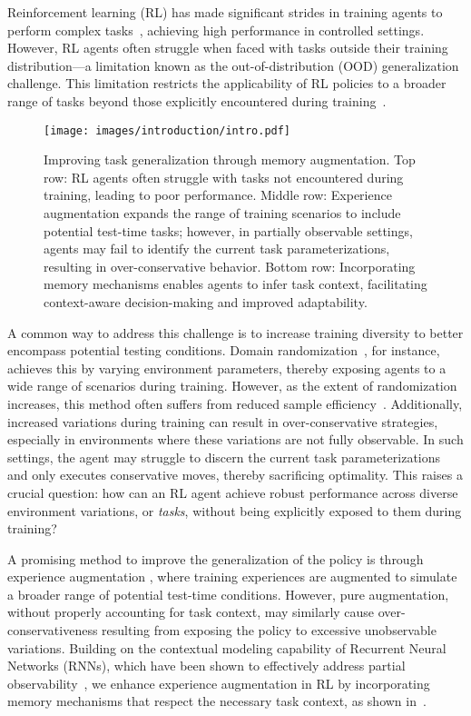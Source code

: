 Reinforcement learning (RL) has made significant strides in training agents to perform complex tasks~\citep{lee2020LearnQuadrupedalLoco, kumar2021rma, miki2022perceptiveLoco, hoeller2024parkour, li2023learning}, achieving high performance in controlled settings.
However, RL agents often struggle when faced with tasks outside their training distribution—a limitation known as the out-of-distribution (OOD) generalization challenge.
This limitation restricts the applicability of RL policies to a broader range of tasks beyond those explicitly encountered during training~\citep{li2023versatile, li2024fld}.

\begin{figure}
\centering
\texttt{[image: images/introduction/intro.pdf]}
\caption{Improving task generalization through memory augmentation. Top row: RL agents often struggle with tasks not encountered during training, leading to poor performance.
Middle row: Experience augmentation expands the range of training scenarios to include potential test-time tasks; however, in partially observable settings, agents may fail to identify the current task parameterizations, resulting in over-conservative behavior.
Bottom row: Incorporating memory mechanisms enables agents to infer task context, facilitating context-aware decision-making and improved adaptability.}
\label{fig:intro}
\end{figure}

A common way to address this challenge is to increase training diversity to better encompass potential testing conditions. 
Domain randomization~\citep{tobin2017DRforSim2Real, sadeghi2016cad2rl, peng2018DynRand}, for instance, achieves this by varying environment parameters, thereby exposing agents to a wide range of scenarios during training.
However, as the extent of randomization increases, this method often suffers from reduced sample efficiency~\citep{kirk2023surveyZSG}. 
Additionally, increased variations during training can result in over-conservative strategies, especially in environments where these variations are not fully observable.
In such settings, the agent may struggle to discern the current task parameterizations and only executes conservative moves, thereby sacrificing optimality.
This raises a crucial question: how can an RL agent achieve robust performance across diverse environment variations, or \textit{tasks}, without being explicitly exposed to them during training?

A promising method to improve the generalization of the policy is through experience augmentation \cite{andrychowicz2017HER}, where training experiences are augmented to simulate a broader range of potential test-time conditions.
However, pure augmentation, without properly accounting for task context, may similarly cause over-conservativeness resulting from exposing the policy to excessive unobservable variations.
Building on the contextual modeling capability of Recurrent Neural Networks (RNNs), which have been shown to effectively address partial observability~\citep{heess1512memoryRNN}, we enhance experience augmentation in RL by incorporating memory mechanisms that respect the necessary task context, as shown in~.

